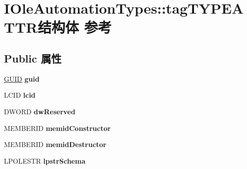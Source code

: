 \hypertarget{struct_i_ole_automation_types_1_1tag_t_y_p_e_a_t_t_r}{}\section{I\+Ole\+Automation\+Types\+:\+:tag\+T\+Y\+P\+E\+A\+T\+T\+R结构体 参考}
\label{struct_i_ole_automation_types_1_1tag_t_y_p_e_a_t_t_r}
\subsection*{Public 属性}
\begin{DoxyCompactItemize}
\item 
\mbox{\label{struct_i_ole_automation_types_1_1tag_t_y_p_e_a_t_t_r_adfd4aca0e1fbd993ed5fae7836a9f593}} 
\hyperlink{interface_g_u_i_d}{G\+U\+ID} {\bfseries guid}
\item 
\mbox{\label{struct_i_ole_automation_types_1_1tag_t_y_p_e_a_t_t_r_aa1c71f4e24f8aa1d04fd2e77504daf22}} 
L\+C\+ID {\bfseries lcid}
\item 
\mbox{\label{struct_i_ole_automation_types_1_1tag_t_y_p_e_a_t_t_r_a630c645e0d1bf776763c916327f4a813}} 
D\+W\+O\+RD {\bfseries dw\+Reserved}
\item 
\mbox{\label{struct_i_ole_automation_types_1_1tag_t_y_p_e_a_t_t_r_a5a13378b72db803bb5defeae0c0e2f49}} 
M\+E\+M\+B\+E\+R\+ID {\bfseries memid\+Constructor}
\item 
\mbox{\label{struct_i_ole_automation_types_1_1tag_t_y_p_e_a_t_t_r_aeca3e09e2b477ccb9801bed020f903d8}} 
M\+E\+M\+B\+E\+R\+ID {\bfseries memid\+Destructor}
\item 
\mbox{\label{struct_i_ole_automation_types_1_1tag_t_y_p_e_a_t_t_r_a9bee3f515f96e30c3962310dde7d5807}} 
L\+P\+O\+L\+E\+S\+TR {\bfseries lpstr\+Schema}
\item 
\mbox{\label{struct_i_ole_automation_types_1_1tag_t_y_p_e_a_t_t_r_a7d92d737b198c55085690a98d3f21f5c}} 

\end{DoxyCompactItemize}
